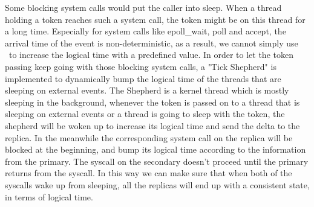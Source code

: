 Some blocking system calls would put the caller into sleep. When a thread holding a token reaches such a system call, the token might be on this thread for a long time. Especially for system calls like epoll\_wait, poll and accept, the arrival time of the event is non-deterministic, as a result, we cannot simply use \dettick\ to increase the logical time with a predefined value. In order to let the token passing keep going with those blocking system calls, a "Tick Shepherd" is implemented to dynamically bump the logical time of the threads that are sleeping on external events. The Shepherd is a kernel thread which is mostly sleeping in the background, whenever the token is passed on to a thread that is sleeping on external events or a thread is going to sleep with the token, the shepherd will be woken up to increase its logical time and send the delta to the replica. In the meanwhile the corresponding system call on the replica will be blocked at the beginning, and bump its logical time according to the information from the primary. The syscall on the secondary doesn't proceed until the primary returns from the syscall. In this way we can make sure that when both of the syscalls wake up from sleeping, all the replicas will end up with a consistent state, in terms of logical time.
